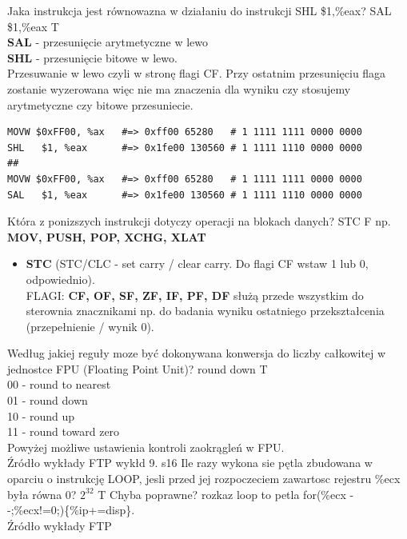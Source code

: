 \answer
{Jaka instrukcja jest równowazna w działaniu do instrukcji SHL \$1,\%eax?}
{SAL \$1,\%eax}
{T}
{}
{\\\textbf{SAL} - przesunięcie arytmetyczne w lewo\\
	\textbf{SHL} - przesunięcie bitowe w lewo.\\
	Przesuwanie w lewo czyli w stronę flagi CF. Przy ostatnim przesunięciu flaga zostanie wyzerowana więc nie ma znaczenia dla wyniku czy stosujemy arytmetyczne czy bitowe przesuniecie.}
\begin{lstlisting}
MOVW $0xFF00, %ax   #=> 0xff00 65280   # 1 1111 1111 0000 0000
SHL   $1, %eax      #=> 0x1fe00 130560 # 1 1111 1110 0000 0000
##
MOVW $0xFF00, %ax   #=> 0xff00 65280   # 1 1111 1111 0000 0000
SAL   $1, %eax      #=> 0x1fe00 130560 # 1 1111 1110 0000 0000

\end{lstlisting}
\answer
{Która z ponizszych instrukcji dotyczy operacji na blokach danych?}
{STC}
{F}
{np. \textbf{MOV, PUSH, POP, XCHG, XLAT}}
{\begin{itemize}
		\item[] \textbf{STC} (STC/CLC - set carry / clear carry. Do flagi CF wstaw 1 lub 0, odpowiednio). \\FLAGI: \textbf{CF, OF, SF, ZF, IF, PF, DF} służą przede wszystkim do sterownia znacznikami np. do badania wyniku ostatniego przekształcenia (przepełnienie / wynik 0).
	\end{itemize}}
	\answer
	{Według jakiej reguły moze być dokonywana konwersja do liczby całkowitej w jednostce FPU (Floating Point Unit)?
	}
	{round down}
	{T}
	{\\
		00 - round to nearest\\
		01 - round down\\
		10 - round up\\
		11 - round toward zero\\}
	{Powyżej możliwe ustawienia kontroli zaokrągleń w FPU. \\Źródło wykłady FTP wykłd 9. s16}
	\answer
	{Ile razy wykona sie pętla zbudowana w oparciu o instrukcję LOOP, jesli przed jej rozpoczeciem zawartosc rejestru \%ecx była równa 0? }
	{$2^{32}$}
	{T}
	{Chyba poprawne?}
	{rozkaz loop to petla for(\%ecx - -;\%ecx!=0;)\{\%ip+=disp\}. \\Źródło wykłady FTP}
